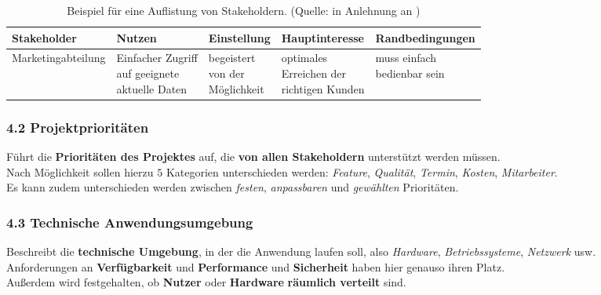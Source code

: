 \begin{table}
[htbp]
    \centering
    \begin{tabular}{|l|l|l|l|l|}
        \hline
        \textbf{Stakeholder} & \textbf{Nutzen} & \textbf{Einstellung} & \textbf{Hauptinteresse} & \textbf{Randbedingungen}   \\
        \hline
        Marketingabteilung & \makecell{Einfacher Zugriff\\auf geeignete\\aktuelle Daten} & \makecell{begeistert\\von der\\Möglichkeit} & \makecell{optimales\\Erreichen der\\richtigen Kunden} & \makecell{muss einfach\\bedienbar sein} \\
        \hline
    \end{tabular}
    \caption{Beispiel für eine Auflistung von Stakeholdern. (Quelle: in Anlehnung an \cite[85]{Wed09})}\label{tab:stakeholder}
\end{table}




\subsubsection*{4.2 Projektprioritäten}
Führt die \textbf{Prioritäten des Projektes} auf, die \textbf{von allen Stakeholdern} unterstützt werden müssen.\\
Nach Möglichkeit sollen hierzu $5$ Kategorien unterschieden werden: \textit{Feature}, \textit{Qualität}, \textit{Termin},
\textit{Kosten}, \textit{Mitarbeiter}. \\
Es kann zudem unterschieden werden zwischen \textit{festen}, \textit{anpassbaren} und \textit{gewählten} Prioritäten.\\

\subsubsection*{4.3 Technische Anwendungsumgebung}
Beschreibt die \textbf{technische Umgebung}, in der die Anwendung laufen soll, also \textit{Hardware}, \textit{Betriebssysteme}, \textit{Netzwerk} usw.\\
Anforderungen an \textbf{Verfügbarkeit} und \textbf{Performance} und \textbf{Sicherheit} haben hier genauso ihren Platz.\\
Außerdem wird festgehalten, ob \textbf{Nutzer} oder \textbf{Hardware} \textbf{räumlich verteilt} sind.
